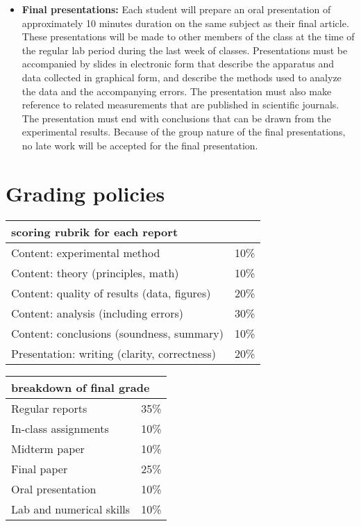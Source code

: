 \documentclass{revtex4}
\begin{document}
\begin{itemize}
\item
{\bf Final presentations:} Each student will prepare an oral
presentation of approximately 10 minutes duration on the same subject
as their final article.  These presentations will be made to 
other members of the class at the time of the regular lab period
during the last week of classes.  Presentations must be accompanied
by slides in electronic form that describe the apparatus and data
collected in graphical form, and describe the methods used to analyze
the data and the accompanying errors.  The presentation must also
make reference to related measurements that are published in
scientific journals.  The presentation must end with conclusions
that can be drawn from the experimental results.  Because of the
group nature of the final presentations, no late work will be
accepted for the final presentation.
\end{itemize}

\section{Grading policies}

\hspace*{2cm}
\begin{tabular}{lr}
\multicolumn{2}{l}{scoring rubrik for each report} \\
\hline
Content: experimental method & 10\% \\
Content: theory (principles, math) & 10\% \\
Content: quality of results (data, figures) & 20\% \\
Content: analysis (including errors) & 30\% \\
Content: conclusions (soundness, summary) & 10\% \\
Presentation: writing (clarity, correctness) & 20\% \\
\hline
\end{tabular}
\hspace{1cm}
\begin{tabular}{lr}
\multicolumn{2}{l}{breakdown of final grade} \\
\hline
Regular reports & 35\% \\
In-class assignments & 10\% \\
Midterm paper & 10\% \\
Final paper & 25\% \\
Oral presentation & 10\% \\
Lab and numerical skills & 10\% \\
\hline
\end{tabular}
\vspace{1cm}
\end{document}
